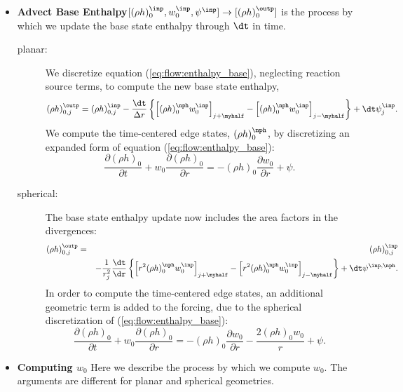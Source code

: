 \begin{itemize}
\item {\bf Advect Base Enthalpy}$[(\rho h)_0^\inp,w_0^\inp,\psi^\inp] \rightarrow [(\rho h)_0^\outp]$
  is the process by which we update the base state enthalpy through $\dt$ in time.  
\begin{description}
\item[planar:] We discretize equation (\ref{eq:flow:enthalpy_base}), neglecting reaction 
source terms, to compute the new base state enthalpy,
\begin{equation}
(\rho h)_{0,j}^{\outp} = (\rho h)_{0,j}^{\inp} - \frac{\dt}{\Delta r} \left\{ \left[ (\rho h)_0^{\nph} w_0^{\inp}\right]_{j+\myhalf} - \left[ (\rho h)_0^{\nph} w_0^{\inp}\right]_{j-\myhalf} \right\} + \dt\psi_j^{\inp}.
\end{equation}
  We compute the time-centered edge states, $(\rho h)_0^{\nph}$, by discretizing
  an expanded form of equation (\ref{eq:flow:enthalpy_base}):
\begin{equation}
\frac{\partial (\rho h)_0}{\partial t} + w_0 \frac{\partial (\rho h)_0}{\partial r} = -(\rho h)_0 \frac{\partial w_0}{\partial r} + \psi.
\end{equation}
\item[spherical:]  The base state enthalpy update now includes the area factors 
  in the divergences:
\begin{eqnarray}
(\rho h)_{0,j}^{\outp} &=& (\rho h)_{0,j}^{\inp} \nonumber \\
&& - \frac{1}{r_j^2} \frac{\dt}{\dr} \left \{ \left[ r^2 (\rho h)_0^{\nph} w_0^{\inp}\right]_{j+\myhalf} - \left[ r^2 (\rho h)_0^{\nph} w_0^{\inp}\right]_{j-\myhalf} \right\} +\dt\psi^{\inp,\nph}.\nonumber\\
\end{eqnarray}
  In order to compute the time-centered edge states, an additional geometric 
  term is added to the forcing, due to the spherical discretization of 
  (\ref{eq:flow:enthalpy_base}):
\begin{equation}
\frac{\partial (\rho h)_0}{\partial t} + w_0 \frac{\partial (\rho h)_0}{\partial r} = -(\rho h)_0 \frac{\partial w_0}{\partial r} - \frac{2 (\rho h)_0 w_0}{r} + \psi.
\end{equation}
\end{description}

\item {\bf Computing {\boldmath $w_0$}}\label{Sec:Computing w0}
Here we describe the process by which we compute $w_0$.  The arguments 
are different for planar and spherical geometries.
\begin{description}


\end{description}
\end{itemize}
